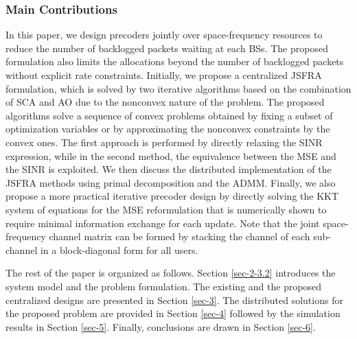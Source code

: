 \subsubsection*{Main Contributions}
In this paper, we design precoders jointly over space-frequency resources to reduce the number of backlogged packets waiting at each \acp{BS}. The proposed formulation also limits the allocations beyond the number of backlogged packets without explicit rate constraints. Initially, we propose a centralized \ac{JSFRA} formulation, which is solved by two iterative algorithms based on the combination of \ac{SCA} and \ac{AO} due to the nonconvex nature of the problem. The proposed algorithms solve a sequence of convex problems obtained by fixing a subset of optimization variables or by approximating the nonconvex constraints by the convex ones. The first approach is performed by directly relaxing the \ac{SINR} expression, while in the second method, the equivalence between the \ac{MSE} and the \ac{SINR} is exploited. We then discuss the distributed implementation of the \ac{JSFRA} methods using primal decomposition and the \ac{ADMM}. Finally, we also propose a more practical iterative precoder design by directly solving the \ac{KKT} system of equations for the \ac{MSE} reformulation that is numerically shown to require minimal information exchange for each update. Note that the joint space-frequency channel matrix can be formed by stacking the channel of each sub-channel in a block-diagonal form for all users.

The rest of the paper is organized as follows. Section \ref{sec-2-3.2} introduces the system model and the problem formulation. The existing and the proposed centralized designs are presented in Section \ref{sec-3}. The distributed solutions for the proposed problem are provided in Section \ref{sec-4} followed by the simulation results in Section \ref{sec-5}. Finally, conclusions are drawn in Section \ref{sec-6}.